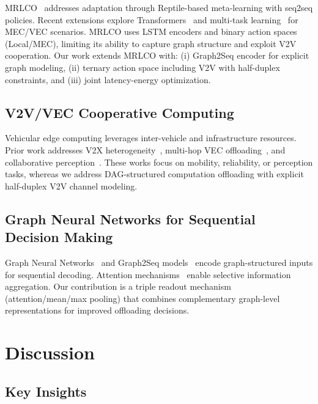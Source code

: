 \documentclass[journal,twoside]{IEEEtran}
\newcommand{\baseline}{\textsc{MRLCO}}
\begin{document}
\baseline{}~\cite{wang2020fast} addresses adaptation through Reptile-based meta-learning with seq2seq policies. Recent extensions explore Transformers~\cite{li2023gtrxlpr} and multi-task learning~\cite{dai2024smrlmto} for MEC/VEC scenarios. \baseline{} uses LSTM encoders and binary action spaces (Local/MEC), limiting its ability to capture graph structure and exploit V2V cooperation. Our work extends \baseline{} with: (i) Graph2Seq encoder for explicit graph modeling, (ii) ternary action space including V2V with half-duplex constraints, and (iii) joint latency-energy optimization.

\subsection{V2V/VEC Cooperative Computing}

Vehicular edge computing leverages inter-vehicle and infrastructure resources. Prior work addresses V2X heterogeneity~\cite{xiong2020v2x}, multi-hop VEC offloading~\cite{liu2021multihop}, and collaborative perception~\cite{xiao2022perception}. These works focus on mobility, reliability, or perception tasks, whereas we address DAG-structured computation offloading with explicit half-duplex V2V channel modeling.

\subsection{Graph Neural Networks for Sequential Decision Making}

Graph Neural Networks~\cite{hamilton2017inductive} and Graph2Seq models~\cite{xu2018graph2seq} encode graph-structured inputs for sequential decoding. Attention mechanisms~\cite{luong2015effective} enable selective information aggregation. Our contribution is a triple readout mechanism (attention/mean/max pooling) that combines complementary graph-level representations for improved offloading decisions.

    \section{Discussion}
    \label{sec:discussion}

\subsection{Key Insights}
\end{document}
